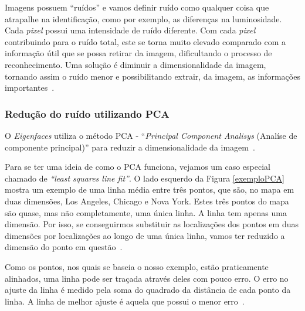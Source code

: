 Imagens possuem ``ruídos'' e vamos definir ruído como qualquer coisa que atrapalhe na identificação, como por exemplo, as diferenças na luminosidade. Cada \textit{pixel} possui uma intensidade de ruído diferente. Com cada \textit{pixel} contribuindo para o ruído total, este se torna muito elevado comparado com a informação útil que se possa retirar da imagem, dificultando o processo de reconhecimento. Uma solução é diminuir a dimensionalidade da imagem, tornando assim o ruído menor e possibilitando extrair, da imagem, as informações importantes~\cite{hewitt}.

\subsubsection{Redução do ruído utilizando PCA}

O \textit{Eigenfaces} utiliza o método PCA - ``\textit{Principal Component Analisys} (Analíse de componente principal)'' para reduzir a dimensionalidade da imagem~\cite{hewitt}.

Para se ter uma ideia de como o PCA funciona, vejamos um caso especial chamado de \textit{``least squares line fit''}. O lado esquerdo da Figura \ref{exemploPCA} mostra um exemplo de uma linha média entre três pontos, que são, no mapa em duas dimensões, Los Angeles, Chicago e Nova York. Estes três pontos do mapa são quase, mas não completamente, uma única linha. A linha tem apenas uma dimensão. Por isso, se conseguirmos substituir as localizações dos pontos em duas dimensões por localizações ao longo de uma única linha, vamos ter reduzido a dimensão do ponto em questão~\cite{hewitt}.

Como os pontos, nos quais se baseia o nosso exemplo, estão praticamente alinhados, uma linha pode ser traçada através deles com pouco erro. O erro no ajuste da linha é medido pela soma do quadrado da distância de cada ponto da linha. A linha de melhor ajuste é aquela que possui o menor erro~\cite{hewitt}.

